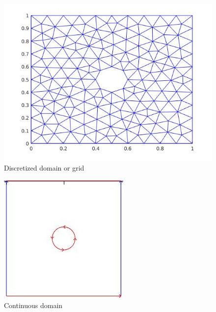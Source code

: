 \documentclass[a4paper,10pt]{book}
\begin{document}
\begin{figure}
  \includegraphics[width=\linewidth,scale=0.5]{grid.jpg}
  \caption{Discretized domain or grid}
  \label{fig:Mesh}
\end{figure}

\begin{figure}
  \includegraphics[width=\linewidth,scale=0.5]{domain.jpg}
  \caption{Continuous domain}
  \label{fig:Domain}
\end{figure}
\end{document}
